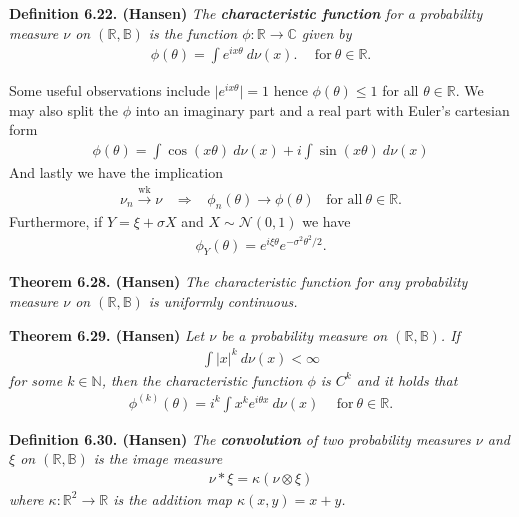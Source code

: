 \documentclass[a4paper,10pt,openany]{book}
\begin{document}
\textbf{Definition 6.22. (Hansen)} \emph{The \textbf{characteristic function} for a probability measure \(\nu\) on \((\mathbb{R},\mathbb{B})\) is the function \(\phi : \mathbb{R}\to \mathbb{C}\) given by}
\begin{align*}
    \phi(\theta)=\int e^{ix\theta}\ d\nu(x).\hspace{15pt}\text{for}\ \theta\in\mathbb{R}.\tag{6.23}
\end{align*}

Some useful observations include \(\vert e^{ix\theta}\vert = 1\) hence \(\phi(\theta)\le 1\) for all \(\theta\in\mathbb{R}\). We may also split the \(\phi\) into an imaginary part and a real part with Euler's cartesian form
\begin{align*}
    \phi(\theta)=\int \cos (x\theta)\ d\nu(x)+i\int \sin (x\theta)\ d\nu(x)\tag{6.24}
\end{align*}
And lastly we have the implication
\begin{align*}
    \nu_n\stackrel{\text{wk}}{\to} \nu \hspace{10pt}\Rightarrow\hspace{10pt} \phi_n(\theta)\to \phi(\theta)\hspace{10pt}\text{for all}\ \theta\in\mathbb{R}.
\end{align*}
Furthermore, if \(Y=\xi+\sigma X\) and \(X\sim \mathcal{N}(0,1)\) we have
\begin{align*}
    \phi_Y(\theta)=e^{i\xi\theta}e^{-\sigma^2\theta^2/2}.
\end{align*}

\textbf{Theorem 6.28. (Hansen)} \emph{The characteristic function for any probability measure \(\nu\) on \((\mathbb{R},\mathbb{B})\) is uniformly continuous.}

\textbf{Theorem 6.29. (Hansen)} \emph{Let \(\nu\) be a probability measure on \((\mathbb{R},\mathbb{B})\). If}
\begin{align*}
    \int \vert x\vert^k\ d\nu(x)<\infty
\end{align*}
\emph{for some \(k\in\mathbb{N}\), then the characteristic function \(\phi\) is \(C^k\) and it holds that}
\begin{align*}
    \phi^{(k)}(\theta)=i^k\int x^ke^{i\theta x}\ d\nu(x)\hspace{15pt}\text{for}\ \theta\in\mathbb{R}.\tag{6.31}
\end{align*}

\textbf{Definition 6.30. (Hansen)} \emph{The \textbf{convolution} of two probability measures \(\nu\) and \(\xi\) on \((\mathbb{R},\mathbb{B})\) is the image measure}
\begin{align*}
    \nu * \xi=\kappa (\nu\otimes\xi)\tag{6.33}
\end{align*}
\emph{where \(\kappa : \mathbb{R}^2\to\mathbb{R}\) is the addition map \(\kappa(x,y)=x+y\).}
\end{document}
